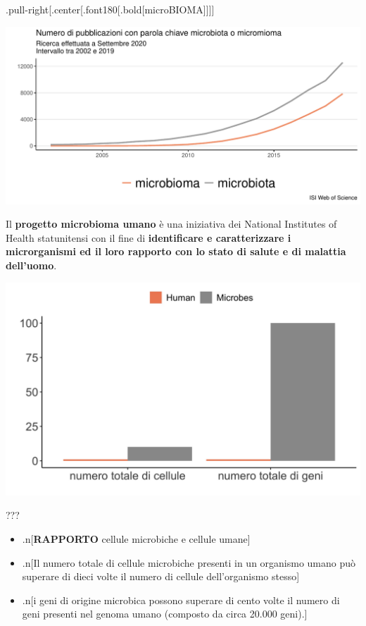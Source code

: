 \documentclass[
]{article}
\begin{document}
.pull-right{[}.center{[}.font180{[}.bold{[}microBIOMA{]}{]}{]}{]}

\begin{center}\includegraphics[width=550px]{images/microPublications} \end{center}

Il \textbf{progetto microbioma umano} è una iniziativa dei National
Institutes of Health statunitensi con il fine di \textbf{identificare e
caratterizzare i microrganismi ed il loro rapporto con lo stato di
salute e di malattia dell'uomo}.

\begin{center}\includegraphics[width=700px]{images/microNubers} \end{center}

???

\begin{itemize}
\item
  .n{[}\textbf{RAPPORTO} cellule microbiche e cellule umane{]}
\item
  .n{[}Il numero totale di cellule microbiche presenti in un organismo
  umano può superare di dieci volte il numero di cellule dell'organismo
  stesso{]}
\item
  .n{[}i geni di origine microbica possono superare di cento volte il
  numero di geni presenti nel genoma umano (composto da circa 20.000
  geni).{]}
\end{itemize}
\end{document}
